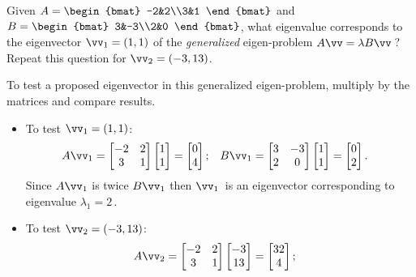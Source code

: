 \begin{example} 
Given \(A=\begin{bmat} -2&2\\3&1 \end{bmat}\) and \(B=\begin{bmat} 3&-3\\2&0 \end{bmat}\), what eigenvalue corresponds to the eigenvector \(\vv_1=(1,1)\) of the \emph{generalized} eigen-problem \(A\vv=\lambda B\vv\)\,?  
Repeat this question for \(\vv_2=(-3,13)\).
\begin{solution} To test a proposed eigenvector in this generalized eigen-problem,  multiply by the matrices and compare results.
\begin{itemize}
\item To test \(\vv_1=(1,1)\):
\begin{align*}
&A\vv_1=\begin{bmatrix} -2&2\\3&1 \end{bmatrix}\begin{bmatrix} 1\\1 \end{bmatrix}
=\begin{bmatrix} 0\\4 \end{bmatrix};
&&B\vv_1=\begin{bmatrix} 3&-3\\2&0 \end{bmatrix}\begin{bmatrix} 1\\1 \end{bmatrix}
=\begin{bmatrix} 0\\2 \end{bmatrix}.
\end{align*}
Since \(A\vv_1\) is twice \(B\vv_1\) then \(\vv_1\)~is an eigenvector corresponding to eigenvalue \(\lambda_1=2\)\,.
\item To test \(\vv_2=(-3,13)\):
\begin{align*}
&A\vv_2=\begin{bmatrix} -2&2\\3&1 \end{bmatrix}\begin{bmatrix} -3\\13 \end{bmatrix}
=\begin{bmatrix} 32\\4 \end{bmatrix};

\end{align*}
\end{itemize}
\end{solution}
\end{example}
